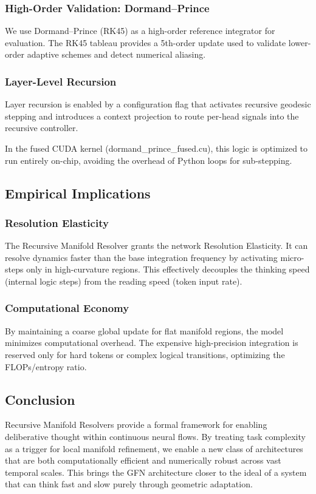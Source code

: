 \documentclass{article}
\numberwithin{equation}{section}
\begin{document}
\subsubsection{High-Order Validation: Dormand--Prince}
We use Dormand--Prince (RK45) as a high-order reference integrator for evaluation. The RK45 tableau provides a 5th-order update used to validate lower-order adaptive schemes and detect numerical aliasing.

\subsubsection{Layer-Level Recursion}
Layer recursion is enabled by a configuration flag that activates recursive geodesic stepping and introduces a context projection to route per-head signals into the recursive controller.

In the fused CUDA kernel (dormand\_prince\_fused.cu), this logic is optimized to run entirely on-chip, avoiding the overhead of Python loops for sub-stepping.

\subsection{Empirical Implications}
\subsubsection{Resolution Elasticity}
The Recursive Manifold Resolver grants the network Resolution Elasticity. It can resolve dynamics faster than the base integration frequency by activating micro-steps only in high-curvature regions. This effectively decouples the thinking speed (internal logic steps) from the reading speed (token input rate).

\subsubsection{Computational Economy}
By maintaining a coarse global update for flat manifold regions, the model minimizes computational overhead. The expensive high-precision integration is reserved only for hard tokens or complex logical transitions, optimizing the FLOPs/entropy ratio.

\subsection{Conclusion}
Recursive Manifold Resolvers provide a formal framework for enabling deliberative thought within continuous neural flows. By treating task complexity as a trigger for local manifold refinement, we enable a new class of architectures that are both computationally efficient and numerically robust across vast temporal scales. This brings the GFN architecture closer to the ideal of a system that can think fast and slow purely through geometric adaptation.
\end{document}
